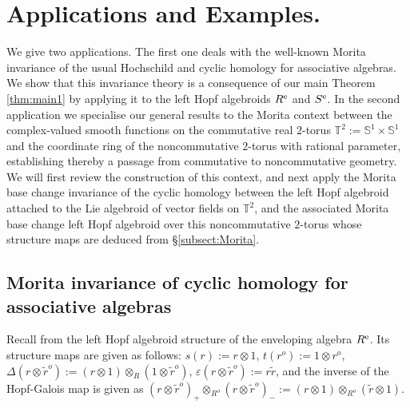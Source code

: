 \documentclass[reqno, a4paper, 10pt]{amsart}
\numberwithin{equation}{section}
\theoremstyle{plain}
\theoremstyle{definition}
\theoremstyle{remark}
\begin{document}
\section{Applications and Examples.}
We give two applications. The first one deals with the well-known Morita invariance of the usual Hochschild and cyclic homology for associative algebras. 
We show that this invariance theory is a consequence of our main Theorem \ref{thm:main1} by applying it to the 
left Hopf algebroids ${{R^{\rm e}}}$ and ${{S^{\rm e}}}$. 
In the second application we specialise our general results to the Morita context between the complex-valued smooth functions on the commutative real $2$-torus $\mathbb{T}^2:=\mathbb{S}^1 \times \mathbb{S}^1$ and the  coordinate ring of the noncommutative $2$-torus  with rational parameter, establishing thereby a passage from commutative to noncommutative geometry. We will first review  the construction of this context, and next  apply the Morita base change invariance of the cyclic homology between the left Hopf algebroid attached to the Lie algebroid of vector fields on $\mathbb{T}^2$, and the associated Morita base change left Hopf algebroid over this noncommutative $2$-torus whose structure maps are deduced from  \S\ref{subsect:Morita}. 

\subsection{Morita invariance of cyclic homology for associative algebras}\label{ssec:algebras} 
Recall from \cite{Schau:DADOQGHA} the left Hopf algebroid structure of the enveloping algebra ${{R^{\rm e}}}$. 
Its structure maps are given as follows: $s(r) := r \otimes 1$, $t(r^o) := 1 \otimes r^o$, 
${\Delta}(r \otimes \tilde{r}^o) := (r \otimes 1) \otimes_{{\scriptscriptstyle{R}}} (1 \otimes \tilde{r}^o)$,
$\varepsilon(r \otimes \tilde{r}^o) := r\tilde{r}$, and the inverse of the Hopf-Galois map is given as 
$
(r \otimes {\tilde{{r}}}^o)_+ \otimes_{{\scriptscriptstyle{{R^{o}}}}} (r \otimes {\tilde{{r}}}^o)_- := (r \otimes 1) \otimes_{{\scriptscriptstyle{{R^{o}}}}} ({\tilde{{r}}} \otimes 1).
$
\end{document}
